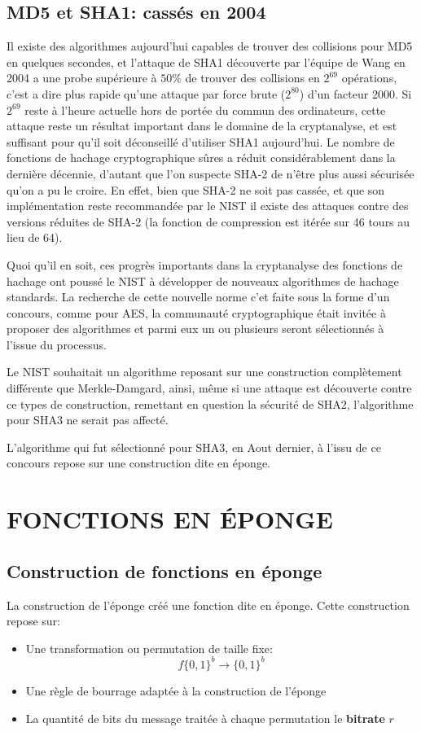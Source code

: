 \documentclass[10.5pt, a4paper, twoside, openright]{report}
\begin{document}
\section{MD5 et SHA1: cassés en 2004}
Il existe des algorithmes aujourd’hui capables de trouver des collisions pour MD5 en quelques secondes, et l’attaque de SHA1 découverte par l’équipe de Wang en 2004 a une probe supérieure à $50\%$ de trouver des collisions en $2^{69}$ opérations, c’est a dire plus rapide qu’une attaque par force brute ($2^80$) d’un facteur 2000.
Si $2^{69}$ reste à l’heure actuelle hors de portée du commun des ordinateurs, cette attaque reste un résultat important dans le domaine de la cryptanalyse, et est suffisant pour qu’il soit déconseillé d’utiliser SHA1 aujourd’hui.
Le nombre de fonctions de hachage cryptographique sûres a réduit considérablement dans la dernière décennie, d’autant que l’on suspecte SHA-2 de n’être plus aussi sécurisée qu’on a pu le croire. En effet, bien que SHA-2 ne soit pas cassée, et que son implémentation reste recommandée par le NIST il existe des attaques contre des versions réduites de SHA-2 (la fonction de compression est itérée sur 46 tours au lieu de 64).

Quoi qu'il en soit, ces progrès importants dans la cryptanalyse des fonctions de hachage ont poussé le NIST à développer de nouveaux algorithmes de hachage standards. La recherche de cette nouvelle norme c'et faite sous la forme d'un concours, comme pour AES, la communauté cryptographique était invitée à proposer des algorithmes et parmi eux un ou plusieurs seront sélectionnés à l’issue du processus.

Le NIST souhaitait un algorithme reposant sur une construction complètement différente que Merkle-Damgard, ainsi, même si une attaque est découverte contre ce types de construction, remettant en question la sécurité de SHA2, l'algorithme pour SHA3 ne serait pas affecté.
 
L'algorithme qui fut sélectionné pour SHA3, en Aout dernier, à l'issu de ce concours repose sur une construction dite en éponge. 

\chapter{FONCTIONS EN ÉPONGE}
\section{Construction de fonctions en éponge}
La construction de l'éponge créé une fonction dite en éponge. Cette construction repose sur:
\begin{itemize}
\item{Une transformation ou permutation de taille fixe:
$$f{\{0,1\}}^b \rightarrow {\{0,1\}}^b$$}
\item{Une règle de bourrage adaptée à la construction de l'éponge}
\item{La quantité de bits du message traitée à chaque permutation le \textbf{bitrate} $r$}
\end{itemize}
\end{document}

